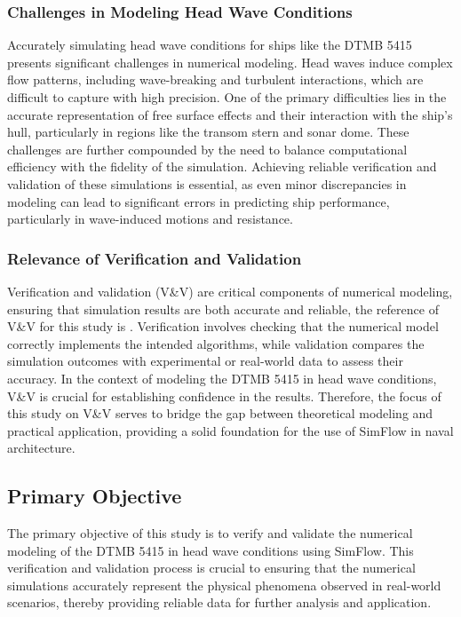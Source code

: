 \documentclass[12pt]{article} %
\begin{document}
\subsubsection{Challenges in Modeling Head Wave Conditions}
Accurately simulating head wave conditions for ships like the DTMB 5415 presents significant 
challenges in numerical modeling. Head waves induce complex flow patterns, including wave-breaking 
and turbulent interactions, which are difficult to capture with high precision. One of the primary 
difficulties lies in the accurate representation of free surface effects and their interaction with 
the ship's hull, particularly in regions like the transom stern and sonar dome. These challenges are 
further compounded by the need to balance computational efficiency with the fidelity of the simulation. 
Achieving reliable verification and validation of these simulations is essential, as even minor 
discrepancies in modeling can lead to significant errors in predicting ship performance, particularly 
in wave-induced motions and resistance.

\subsubsection{Relevance of Verification and Validation}
Verification and validation (V\&V) are critical components of numerical modeling, ensuring that 
simulation results are both accurate and reliable, the reference of V\&V for this study is \cite{Begovic2017}. 
Verification involves checking that the 
numerical model correctly implements the intended algorithms, while validation compares the 
simulation outcomes with experimental or real-world data to assess their accuracy. In the 
context of modeling the DTMB 5415 in head wave conditions, V\&V is crucial for establishing 
confidence in the results.
Therefore, the focus of this study on V\&V serves to bridge the gap between theoretical modeling 
and practical application, providing a solid foundation for the use of SimFlow in naval architecture.

\subsection{Primary Objective}
The primary objective of this study is to verify and validate the numerical modeling of the DTMB 5415 
in head wave conditions using SimFlow. This verification and validation process is crucial to 
ensuring that the numerical simulations accurately represent the physical phenomena observed in 
real-world scenarios, thereby providing reliable data for further analysis and application.
\end{document}
